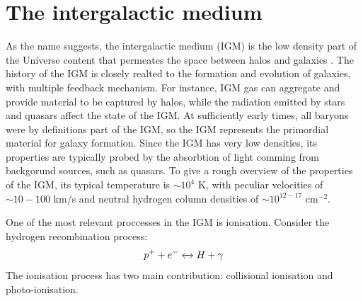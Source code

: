 \section{The intergalactic medium}\label{sec:IGM}
As the name suggests, the intergalactic medium (IGM) is the low density part of the Universe content that permeates the space between halos and galaxies \cite{Mo2010}. The history of the IGM is closely realted to the formation and evolution of galaxies, with multiple feedback mechanism. For instance, IGM gas can aggregate and provide material to be captured by halos, while the radiation emitted by stars and quasars affect the state of the IGM. At sufficiently early times, all baryons were by definitions part of the IGM, so the IGM represents the primordial material for galaxy formation. Since the IGM has very low densities, its properties are typically probed by the absorbtion of light comming from backgorund sources, such as quasars. To give a rough overview of the properties of the IGM, its typical temperature is $\sim 10^4$ K, with peculiar velocities of $\sim 10-100$ km/s and neutral hydrogen column densities of $\sim 10^{12-17}$ cm$^{-2}$.

One of the most relevant proccesses in the IGM is ionisation. Consider the hydrogen recombination process:
$$p^+ + e^- \xleftrightarrow \ H +\gamma$$
The ionisation process has two main contribution: collisional ionisation and photo-ionisation.

